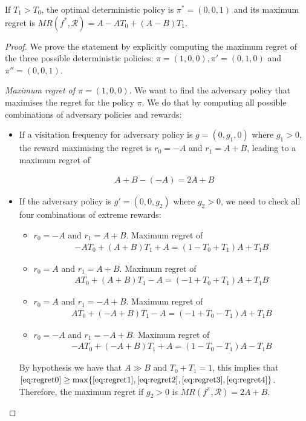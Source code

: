 \begin{proposition}\label{theorem:opt_det}
If $T_1 > T_0$, the optimal deterministic policy is $\pi^* = (0, 0, 1)$ and its maximum regret is $MR(f^*, \mathcal{R}) = A- A T_0 +(A-B) T_1$. 
\end{proposition}
\begin{proof}
We prove the statement by explicitly computing the maximum regret of the three possible deterministic policies: $\pi = (1, 0, 0), \pi' =(0, 1, 0)$ and $ \pi''= (0, 0, 1)$. 

\textit{Maximum regret of $\pi = (1, 0, 0)$}. We want to find the adversary policy that maximises the regret for the policy $\pi$. We do that by computing all possible combinations of adversary policies and rewards:
\begin{itemize}
\item If a visitation frequency for adversary policy is $g = (0, g_1, 0)$ where $g_1> 0$, the reward maximising the regret is $r_0 = -A$ and $r_1 = A+B$, leading to a maximum regret of 

\begin{align}
A+B-(-A)=2A+B \label{eq:regret0}
\end{align}
\item If the adversary policy is $g' = (0, 0, g_2)$ where $g_2>0$, we need to check all four combinations of extreme rewards:
\begin{itemize}
\item $r_0 = -A$ and $r_1= A+B$. Maximum regret of
\begin{align}
-A T_0 + (A+B)T_1 + A = (1-T_0 + T_1)A + T_1 B \label{eq:regret1}
\end{align}
\item $r_0 = A$ and $r_1= A+B$. Maximum regret of
\begin{align}
A T_0 + (A+B)T_1 - A = (-1+T_0 + T_1)A + T_1 B  \label{eq:regret2}
\end{align}
\item $r_0 = A$ and $r_1= -A+B$. Maximum regret of
\begin{align} 
A T_0 + (-A+B)T_1 - A =  (-1+T_0 - T_1)A + T_1 B \label{eq:regret3}
\end{align}
\item $r_0 = -A$ and $r_1= -A+B$. Maximum regret of
\begin{align}
-A T_0 + (-A+B)T_1 + A =  (1 - T_0 - T_1)A - T_1 B \label{eq:regret4}
\end{align}
\end{itemize} 
By hypothesis we have that $A\gg B$ and $T_0+T_1= 1$, this implies that $\eqref{eq:regret0} \geq \max\{\eqref{eq:regret1}, \eqref{eq:regret2}, \eqref{eq:regret3}, \eqref{eq:regret4} \}$. Therefore, the maximum regret if $g_2>0$ is $MR(f^{\pi}, \mathcal{R}) = 2A+B$.
\end{itemize} 


\end{proof}
